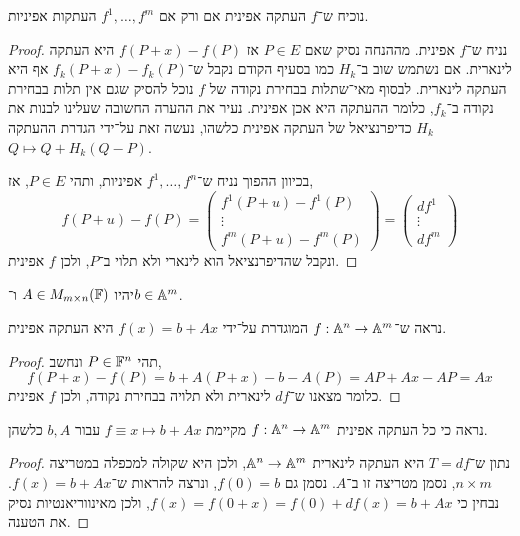 \subquestion{}
נוכיח ש־$f$ העתקה אפינית אם ורק אם $f^1, \ldots, f^m$ העתקות אפיניות.
\begin{proof}
	נניח ש־$f$ אפינית.
	מההנחה נסיק שאם $P \in E$ אז $f(P + x) - f(P)$ היא העתקה לינארית.
	אם נשתמש שוב ב־$H_k$ כמו בסעיף הקודם נקבל ש־$f_k(P + x) - f_k(P)$ אף היא העתקה לינארית.
	לבסוף מאי־שתלות בבחירת נקודה של $f$ נוכל להסיק שגם אין תלות בבחירת נקודה ב־$f_k$, כלומר ההעתקה היא אכן אפינית.
	נעיר את ההערה החשובה שעלינו לבנות את $H_k$ כדיפרנציאל של העתקה אפינית כלשהו,
	נעשה זאת על־ידי הגדרת ההעתקה $Q \mapsto Q + H_k(Q - P)$.

	בכיוון ההפוך נניח ש־$f^1, \ldots, f^n$ אפיניות, ותהי $P \in E$, אז,
	\[
		f(P + u) - f(P)
		= \begin{pmatrix} f^1(P + u) - f^1(P) \\ \vdots \\ f^m(P + u) - f^m(P) \end{pmatrix} 
		= \begin{pmatrix} df^1 \\ \vdots \\ df^m \end{pmatrix} 
	\]
	ונקבל שהדיפרנציאל הוא לינארי ולא תלוי ב־$P$, ולכן $f$ אפינית.
\end{proof}

\question{}
יהיו $A \in M_{m \times n}(\mathbb{F})$ ו־$b \in \mathbb{A}^m$.

\subquestion{}
נראה ש־$f : \mathbb{A}^n \to \mathbb{A}^m$ המוגדרת על־ידי $f(x) = b + A x$ היא העתקה אפינית.
\begin{proof}
	תהי $P \in \mathbb{F}^n$ ונחשב,
	\[
		f(P + x) - f(P)
		= b + A(P + x) - b - A(P)
		= AP + Ax - AP
		= Ax
	\]
	כלומר מצאנו ש־$df$ לינארית ולא תלויה בבחירת נקודה, ולכן $f$ אפינית.
\end{proof}

\subquestion{}
נראה כי כל העתקה אפינית $f : \mathbb{A}^n \to \mathbb{A}^m$ מקיימת $f \equiv x \mapsto b + Ax$ עבור $b, A$ כלשהן.
\begin{proof}
	נתון ש־$T = df$ היא העתקה לינארית $\mathbb{A}^n \to \mathbb{A}^m$, ולכן היא שקולה למכפלה במטריצה $n \times m$, נסמן מטריצה זו ב־$A$.
	נסמן גם $f(0) = b$, ונרצה להראות ש־$f(x) = b + Ax$.
	נבחין כי $f(x) = f(0 + x) = f(0) + df(x) = b + Ax$, ולכן מאינווריאנטיות נסיק את הטענה.
\end{proof}

